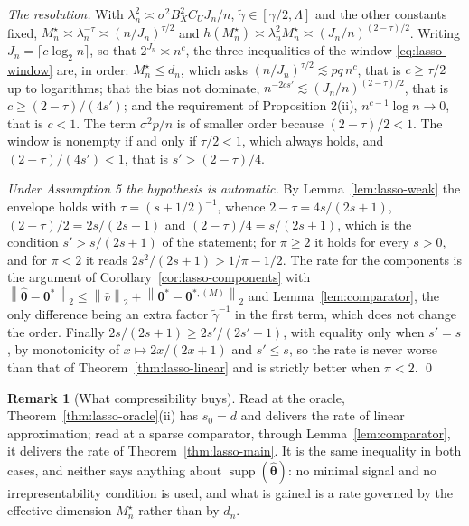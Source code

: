 \documentclass[10pt]{book}
\theoremstyle{definition}
\newtheorem{remark}{Remark}[section]
\newcommand{\norm}[1]{\left\lVert #1 \right\rVert}
\newcommand{\btheta}{\boldsymbol{\theta}}
\newcommand{\thetastar}{\btheta^{*}}
\newcommand{\thetahat}{\widehat{\btheta}}
\newcommand{\penn}{\lambda_{n}}
\newcommand{\seff}{s'}
\newcommand{\gtil}{\widetilde{\gamma}}
\newcommand{\Mstar}{M^{\star}}
\newcommand{\thstarM}[1]{\btheta^{*,(#1)}}
\DeclareMathOperator{\supp}{supp}
\begin{document}
{\emph{The resolution.} With $\penn^2 \asymp \sigma^2B_X^2C_UJ_n/n$,
$\gtil \in [\gamma/2,\Lambda]$ and the other constants fixed,
$\Mstar_n \asymp \penn^{-\tau} \asymp (n/J_n)^{\tau/2}$ and
$h(\Mstar_n) \asymp \penn^2\Mstar_n \asymp (J_n/n)^{(2-\tau)/2}$. Writing
$J_n = \lceil c\log_2 n\rceil$, so that $2^{J_n} \asymp n^{c}$, the three
inequalities of the window \eqref{eq:lasso-window} are, in order: $\Mstar_n \le d_n$, which asks
$(n/J_n)^{\tau/2} \lesssim pq\,n^{c}$, that is $c \ge \tau/2$ up to
logarithms; that the bias not dominate, $n^{-2c\seff} \lesssim
(J_n/n)^{(2-\tau)/2}$, that is $c \ge (2-\tau)/(4\seff)$; and the requirement
of Proposition 2(ii), $n^{c-1}\log n \to 0$, that is $c<1$. The term
$\sigma^2p/n$ is of smaller order because $(2-\tau)/2<1$. The window is
nonempty if and only if $\tau/2<1$, which always holds, and
$(2-\tau)/(4\seff)<1$, that is $\seff>(2-\tau)/4$.

\emph{Under Assumption 5 the hypothesis is automatic.} By Lemma~\ref{lem:lasso-weak} the
envelope holds with $\tau = (s+1/2)^{-1}$, whence $2-\tau = 4s/(2s+1)$,
$(2-\tau)/2 = 2s/(2s+1)$ and $(2-\tau)/4 = s/(2s+1)$, which is the condition
$\seff>s/(2s+1)$ of the statement; for $\pi \ge 2$ it holds for every $s>0$,
and for $\pi<2$ it reads $2s^2/(2s+1)>1/\pi-1/2$. The rate for the components
is the argument of Corollary~\ref{cor:lasso-components} with
$\norm{\thetahat-\thetastar}_2 \le \norm{\bar v}_2 +
\norm{\thetastar-\thstarM{M}}_2$ and Lemma~\ref{lem:comparator}, the only difference being an
extra factor $\gtil^{-1}$ in the first term, which does not change the order.
Finally $2s/(2s+1) \ge 2\seff/(2\seff+1)$, with equality only when
$\seff = s$, by monotonicity of $x \mapsto 2x/(2x+1)$ and $\seff \le s$, so
the rate is never worse than that of Theorem~\ref{thm:lasso-linear} and is strictly better when
$\pi<2$. \qed

\begin{remark}[What compressibility buys]
\label{rem:s0}
Read at the oracle, Theorem~\ref{thm:lasso-oracle}(ii) has $s_0 = d$ and delivers the rate of
\textcolor{colR1}{linear approximation}; read at a sparse comparator, through Lemma~\ref{lem:comparator}, it delivers the rate
of Theorem~\ref{thm:lasso-main}. It is the same inequality in both cases, and neither says
anything about $\supp(\thetahat)$: no minimal signal and no
irrepresentability condition is used, and what is gained is a rate governed by
the effective dimension $\Mstar_n$ rather than by $d_n$.
\end{remark}

}
\end{document}
